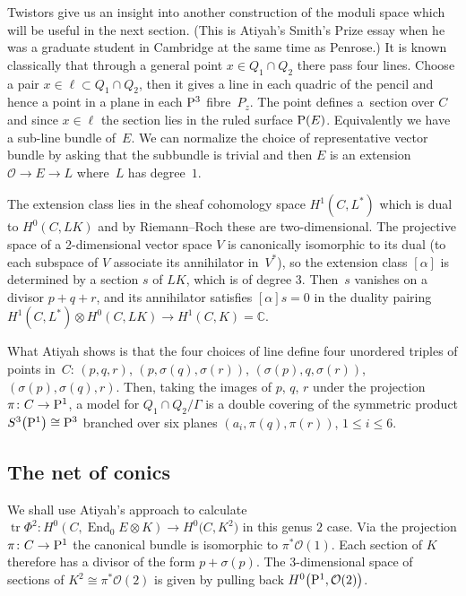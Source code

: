\documentclass[pdftex]{sigma}
\numberwithin{equation}{section}
\begin{document}
Twistors give us an insight into another construction of the moduli space which will be useful in the next section. (This is Atiyah's Smith's Prize essay \cite{Atiyah} when he was a graduate student in Cambridge at the same time as Penrose.) It is known classically that through a general point $x\in Q_1\cap Q_2$ there pass four lines. Choose a pair $x\in \ell\subset Q_1\cap Q_2$, then it gives a line in each quadric of the pencil and hence a point in a plane in each ${\rm P}^3$ fibre~$P_z$. The point defines a~section over $C$ and since $x\in \ell$ the section lies in the ruled surface ${\rm P}(E)$. Equivalently we have a sub-line bundle of~$E$. We can normalize the choice of representative vector bundle by asking that the subbundle is trivial and then $E$ is an extension $\mathcal{O}\rightarrow E\rightarrow L$ where~$L$ has degree~$1$.

The extension class lies in the sheaf cohomology space $H^1(C, L^*)$ which is dual to $H^0(C, LK)$ and by Riemann--Roch these are two-dimensional. The projective space of a 2-dimensional vector space $V$ is canonically isomorphic to its dual (to each subspace of $V$ associate its annihilator in~$V^*$), so the extension class $[\alpha]$ is determined by a section $s$ of $LK$, which is of degree $3$. Then~$s$ vanishes on a divisor $p+q+r$, and its annihilator satisfies $[\alpha] s=0$ in the duality pairing $H^1(C,L^*)\otimes H^0(C,LK)\rightarrow H^1(C,K)={\mathbb C}$.

What Atiyah shows is that the four choices of line define four unordered triples of points in~$C$:
$(p,q,r)$, $(p,\sigma(q),\sigma(r))$, $(\sigma(p),q,\sigma(r))$, $(\sigma(p),\sigma(q),r)$. Then, taking the images of $p$, $q$, $r$ under the projection $\pi\colon C\rightarrow {\rm P}^1$, a model for $Q_1\cap Q_2/\Gamma$ is a double covering of the symmetric product $S^3\big({\rm P}^1\big)\cong {\rm P}^3$ branched over six planes $(a_i,\pi(q),\pi(r))$, $1\le i\le 6$.

\subsection{The net of conics}\label{net}
We shall use Atiyah's approach to calculate $\operatorname{tr}\Phi^2\colon H^0(C,\operatorname{End}_0E\otimes K) \rightarrow H^0\big(C,K^2\big)$ in this genus $2$ case. Via the projection $\pi\colon C\rightarrow {\rm P}^1$ the canonical bundle is isomorphic to $\pi^*\mathcal{O}(1)$. Each section of $K$ therefore has a divisor of the form $p+\sigma(p)$. The $3$-dimensional space of sections of $K^2\cong \pi^*\mathcal{O}(2)$ is given by pulling back $H^0\big({\rm P}^1,\mathcal{O}(2)\big)$.
\end{document}
